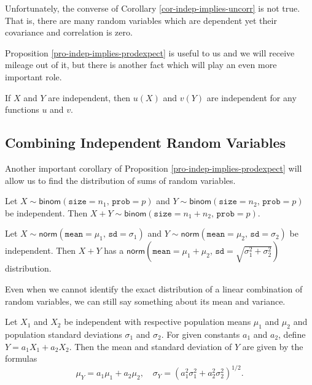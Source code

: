 \begin{rem}
\label{rem-cov0-not-imply-indep} Unfortunately, the converse of Corollary
\ref{cor-indep-implies-uncorr} is not true. That is, there are many random
variables which are dependent yet their covariance and correlation is
zero.
\end{rem}

Proposition \ref{pro-indep-implies-prodexpect} is useful to us and we will
receive mileage out of it, but there is another fact which will play
an even more important role.

\begin{fact}
\label{fac-indep-then-function-indep} If \(X\) and \(Y\) are independent,
then \(u(X)\) and \(v(Y)\) are independent for any functions \(u\) and
\(v\).
\end{fact}

\subsection{Combining Independent Random Variables}
\label{sec-7-4-2}

Another important corollary of Proposition
\ref{pro-indep-implies-prodexpect} will allow us to find the distribution of
sums of random variables.

\begin{cor}
Let \(X\sim\mathsf{binom}(\mathtt{size}=n_{1},\,\mathtt{prob}=p)\) and
\(Y\sim\mathsf{binom}(\mathtt{size}=n_{2},\,\mathtt{prob}=p)\) be
independent.
Then
\(X+Y\sim\mathsf{binom}(\mathtt{size}=n_{1}+n_{2},\,\mathtt{prob}=p)\).
\end{cor}



\begin{cor}
Let
\(X\sim\mathsf{norm}(\mathtt{mean}=\mu_{1},\,\mathtt{sd}=\sigma_{1})\)
and
\(Y\sim\mathsf{norm}(\mathtt{mean}=\mu_{2},\,\mathtt{sd}=\sigma_{2})\)
be independent.
Then \(X+Y\) has a
\(\mathsf{norm}\left(\mathtt{mean}=\mu_{1}+\mu_{2},\,\mathtt{sd}=\sqrt{\sigma_{1}^{2}+\sigma_{2}^{2}}\right)\)
distribution.
\end{cor}


Even when we cannot identify the exact
distribution of a linear combination of random variables, we can still
say something about its mean and variance.

\begin{prop}
\label{pro-mean-sd-lin-comb-two} Let \(X_{1}\) and \(X_{2}\) be
independent with respective population means \(\mu_{1}\) and
\(\mu_{2}\) and population standard deviations \(\sigma_{1}\) and
\(\sigma_{2}\). For given constants \(a_{1}\) and \(a_{2}\), define
\(Y=a_{1}X_{1}+a_{2}X_{2}\). Then the mean and standard deviation of
\(Y\) are given by the formulas
\begin{equation}
\mu_{Y}=a_{1}\mu_{1}+a_{2}\mu_{2},\quad \sigma_{Y}=\left(a_{1}^{2}\sigma_{1}^{2}+a_{2}^{2}\sigma_{2}^{2}\right)^{1/2}.
\end{equation}
\end{prop}

